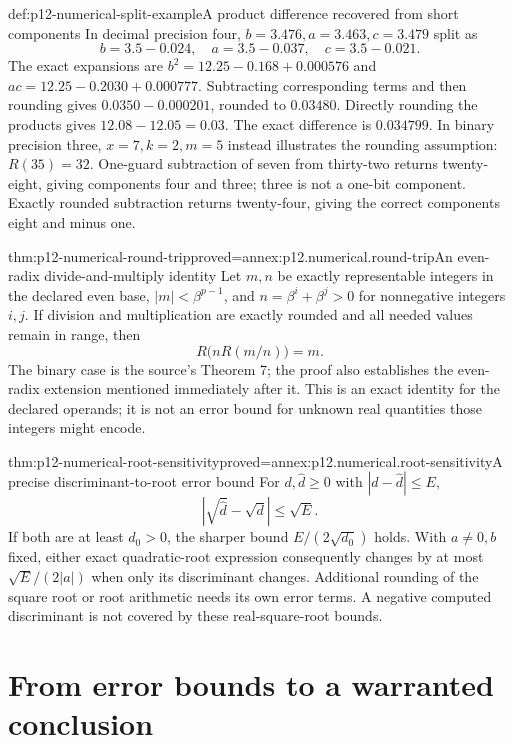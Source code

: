 \begin{hbexample}{def:p12-numerical-split-example}{A product difference recovered from short components}
In decimal precision four, \(b=3.476,a=3.463,c=3.479\) split as
\[
 b=3.5-0.024,\quad a=3.5-0.037,\quad c=3.5-0.021.
\]
The exact expansions are
\(b^2=12.25-0.168+0.000576\) and
\(ac=12.25-0.2030+0.000777\). Subtracting corresponding terms and
then rounding gives \(0.0350-0.000201\), rounded to \(0.03480\).
Directly rounding the products gives \(12.08-12.05=0.03\).
The exact difference is \(0.034799\).
In binary precision three, \(x=7,k=2,m=5\) instead illustrates the
rounding assumption: \(R(35)=32\). One-guard subtraction of seven
from thirty-two returns twenty-eight, giving components four and three;
three is not a one-bit component. Exactly rounded subtraction returns
twenty-four, giving the correct components eight and minus one.
\end{hbexample}

\begin{hbtheorem}{thm:p12-numerical-round-trip}{proved=annex:p12.numerical.round-trip}{An even-radix divide-and-multiply identity}
Let \(m,n\) be exactly representable integers in the declared even base,
\(|m|<\beta^{p-1}\), and \(n=\beta^i+\beta^j>0\) for nonnegative integers
\(i,j\). If division and multiplication are exactly rounded and
all needed values remain in range, then
\[
 R\bigl(n R(m/n)\bigr)=m.
\]
The binary case is the source's Theorem 7; the proof also establishes
the even-radix extension mentioned immediately after it.
This is an exact identity for the declared operands; it is not an error
bound for unknown real quantities those integers might encode.
\end{hbtheorem}

\begin{hbtheorem}{thm:p12-numerical-root-sensitivity}{proved=annex:p12.numerical.root-sensitivity}{A precise discriminant-to-root error bound}
For \(d,\widehat d\geq0\) with \(|d-\widehat d|\leq E\),
\[
 |\sqrt{\widehat d}-\sqrt d|\leq\sqrt E.
\]
If both are at least \(d_0>0\), the sharper bound
\(E/(2\sqrt{d_0})\) holds. With \(a\ne0,b\) fixed, either exact
quadratic-root expression consequently changes by at most
\(\sqrt E/(2|a|)\) when only its discriminant changes.
Additional rounding of the square root or root arithmetic needs its
own error terms. A negative computed discriminant is not covered by
these real-square-root bounds.
\end{hbtheorem}

\section{From error bounds to a warranted conclusion}

